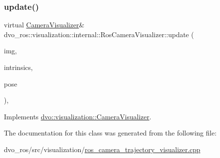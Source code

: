 \subsubsection{\texorpdfstring{update()}{update()}}
{\footnotesize\ttfamily virtual \mbox{\hyperlink{classdvo_1_1visualization_1_1_camera_visualizer}{Camera\+Visualizer}}\& dvo\+\_\+ros\+::visualization\+::internal\+::\+Ros\+Camera\+Visualizer\+::update (\begin{DoxyParamCaption}\item[{const \mbox{\hyperlink{structdvo_1_1core_1_1_rgbd_image}{dvo\+::core\+::\+Rgbd\+Image}} \&}]{img,  }\item[{const \mbox{\hyperlink{structdvo_1_1core_1_1_intrinsic_matrix}{dvo\+::core\+::\+Intrinsic\+Matrix}} \&}]{intrinsics,  }\item[{const Eigen\+::\+Affine3d \&}]{pose }\end{DoxyParamCaption})\hspace{0.3cm}{\ttfamily [inline]}, {\ttfamily [virtual]}}



Implements \mbox{\hyperlink{classdvo_1_1visualization_1_1_camera_visualizer_afd83119e63048b0229820045d54c95ec}{dvo\+::visualization\+::\+Camera\+Visualizer}}.



The documentation for this class was generated from the following file\+:\begin{DoxyCompactItemize}
\item 
dvo\+\_\+ros/src/visualization/\mbox{\hyperlink{ros__camera__trajectory__visualizer_8cpp}{ros\+\_\+camera\+\_\+trajectory\+\_\+visualizer.\+cpp}}\end{DoxyCompactItemize}
